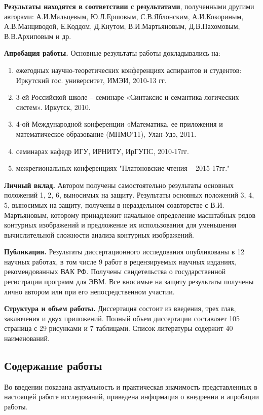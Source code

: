 \textbf{Результаты находятся в соответствии с результатами}, полученными другими авторами: А.И.Мальцевым,  Ю.Л.Ершовым, С.В.Яблонским,  А.И.Кокориным, А.В.Манциводой,  Е.Коддом, Д.Кнутом, В.И.Мартьяновым, Д.В.Пахомовым, В.В.Архиповым и др.

\textbf{Апробация работы.} Основные результаты работы докладывались на: 

\begin{enumerate}
\item ежегодных научно-теоретических конференциях аспирантов и студентов:  Иркутский  гос. университет, ИМЭИ, 2010-13 гг.
\item 3-ей Российской школе – семинаре «Синтаксис и семантика логических систем». Иркутск, 2010.
\item 4-ой Международной конференции «Математика, ее приложения и математическое образование (МПМО’11),  Улан-Удэ, 2011.
\item семинарах кафедр ИГУ, ИРНИТУ, ИрГУПС, 2010-17гг.
\item межрегиональных конференциях "Платоновские чтения – 2015-17гг."
\end{enumerate}


\textbf{Личный вклад.} Автором получены самостоятельно результаты основных положений 1, 2, 6,  выносимых  на защиту.  Результаты основных положений 3, 4, 5,  выносимых  на защиту, получены в нераздельном соавторстве с В.И. Мартьяновым, которому принадлежит начальное определение масштабных рядов контурных изображений и предложение их использования для уменьшения вычислительной сложности анализа контурных изображений.

\textbf{Публикации.} Результаты диссертационного исследования
опубликованы в 12 научных работах, в том числе 9 работ в рецензируемых научных изданиях, рекомендованных ВАК РФ. Получены свидетельства о государственной регистрации программ для ЭВМ.
Все вносимые на защиту результаты получены лично автором или при его непосредственном участии.

\textbf{Структура и объем работы.} Диссертация состоит из введения, трех глав, заключения и двух приложений. Полный объем диссертации составляет 105 страница с 29 рисунками и 7 таблицами. Список литературы содержит 40 наименований.

\subsection*{\Large Содержание работы}
Во введении показана актуальность и практическая значимость представленных в настоящей работе исследований, приведена информация о внедрении и апробации работы.

